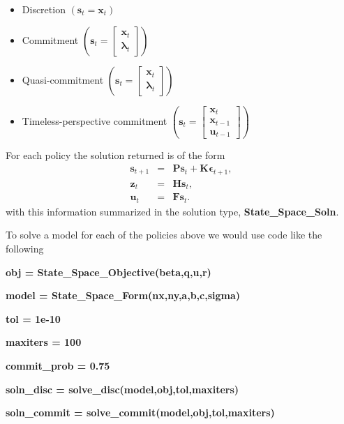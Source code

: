\documentclass[thmsa,notitlepage,11pt]{article}
\begin{document}
\begin{itemize}
\item Discretion $\left( \mathbf{s}_{t}=\mathbf{x}_{t}\right) $

\item Commitment $\left( \mathbf{s}_{t}=\left[ 
\begin{array}{c}
\mathbf{x}_{t} \\ 
\mathbf{\lambda }_{t}%
\end{array}%
\right] \right) $

\item Quasi-commitment  $\left( \mathbf{s}_{t}=\left[ 
\begin{array}{c}
\mathbf{x}_{t} \\ 
\mathbf{\lambda }_{t}%
\end{array}%
\right] \right) $

\item Timeless-perspective commitment $\left( \mathbf{s}_{t}=\left[ 
\begin{array}{c}
\mathbf{x}_{t} \\ 
\mathbf{x}_{t-1} \\ 
\mathbf{u}_{t-1}%
\end{array}%
\right] \right) $
\end{itemize}

For each policy the solution returned is of the form%
\begin{eqnarray*}
\mathbf{s}_{t+1} &=&\mathbf{Ps}_{t}+\mathbf{K\epsilon }_{t+1}, \\
\mathbf{z}_{t} &=&\mathbf{Hs}_{t}, \\
\mathbf{u}_{t} &=&\mathbf{Fs}_{t}.
\end{eqnarray*}%
with this information summarized in the solution type, \textbf{%
State\_Space\_Soln}.

To solve a model for each of the policies above we would use code like the
following

\bigskip 

\textbf{obj = State\_Space\_Objective(beta,q,u,r)}

\textbf{model = State\_Space\_Form(nx,ny,a,b,c,sigma)}

\textbf{tol = 1e-10}

\textbf{maxiters = 100}

\textbf{commit\_prob = 0.75}

\textbf{soln\_disc = solve\_disc(model,obj,tol,maxiters)}

\textbf{soln\_commit = solve\_commit(model,obj,tol,maxiters)}
\end{document}
